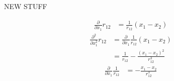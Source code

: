 




NEW STUFF

\begin{align*}
    \frac{\partial}{\partial x_1}r_{12}
    &= \frac{1}{r_{12}} (x_1 - x_2)
\end{align*}
\begin{align*}
    \frac{\partial^2}{\partial x_1^2}r_{12}
    &= \frac{\partial}{\partial x_1} \frac{1}{r_{12}} (x_1 - x_2) \\
    &= \frac{1}{r_{12}} - \frac{(x_1-x_2)^2}{r_{12}^3}
\end{align*}
\begin{align*}
    \frac{\partial}{\partial x_1} \frac{1}{r_{12}}
    &= -\frac{x_1-x_2}{r_{12}^3}
\end{align*}